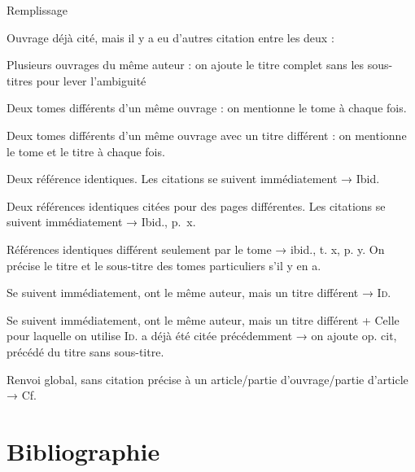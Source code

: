 Remplissage\autocite{artdico}

\newpage
Ouvrage déjà cité, mais il y a eu d'autres citation entre les deux :
\autocite[15]{poucet}\autocite{test}\autocite[31]{poucet}

\newpage
Plusieurs ouvrages du même auteur : on ajoute le titre complet sans les sous-titres pour lever l'ambiguité
\autocite[146]{genettemim}\autocite{test}\autocite[16--29]{genettefig}\autocite{test}\autocite[103]{genettemim}

\newpage
Deux tomes différents d'un même ouvrage : on mentionne le tome à chaque fois.
\autocite[103]{martin1}\autocite{test}\autocite[71]{martin2}

\newpage
Deux tomes différents d'un même ouvrage avec un titre différent : on mentionne le tome et le titre à chaque fois.
\autocite[115]{remond1}\autocite{test}\autocite{remond2}

\newpage
Deux référence identiques. Les citations se suivent immédiatement → Ibid.
\autocite[41--57]{leclerc}\autocite[41--57]{leclerc}

\newpage
Deux références identiques citées pour des pages différentes. Les citations se suivent immédiatement → Ibid., p.~x.
\autocite[105]{vouilloux}\autocite[80]{vouilloux}

\newpage
Références identiques différent seulement par le tome → ibid., t. x, p. y.
On précise le titre et le sous-titre des tomes particuliers s'il y en a.
\autocite[115]{remondx1}\autocite[45]{remondx2}

\newpage
Se suivent immédiatement, ont le même auteur, mais un titre différent → \textsc{Id.}
\autocite[197]{genettexmim}\autocite[91]{genettexfig}

\newpage
Se suivent immédiatement, ont le même auteur, mais un titre différent + Celle pour laquelle on utilise \textsc{Id.} a déjà été citée précédemment → on ajoute op. cit, précédé du titre sans sous-titre.
\autocite[79--93]{genetteyfig}\autocite[146]{genetteymim}\autocite[103]{genetteyfig}

\newpage
Renvoi global, sans citation précise à un article/partie d'ouvrage/partie d'article → Cf.
\autocite[Cf.][]{delatte}




\newpage
\section{Bibliographie}





